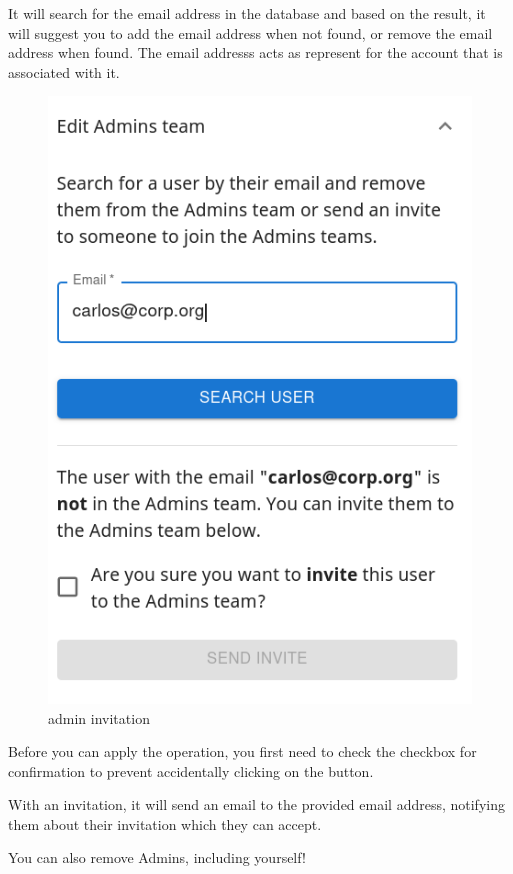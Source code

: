 \documentclass[
]{article}
\begin{document}
It will search for the email address in the database and based on the
result, it will suggest you to add the email address when not found, or
remove the email address when found. The email addresss acts as
represent for the account that is associated with it.

\begin{figure}
\centering
\includegraphics{images/invite_new_admin.png}
\caption{admin invitation}
\end{figure}\newpage

Before you can apply the operation, you first need to check the checkbox
for confirmation to prevent accidentally clicking on the button.

With an invitation, it will send an email to the provided email address,
notifying them about their invitation which they can accept.

You can also remove Admins, including yourself!
\end{document}
